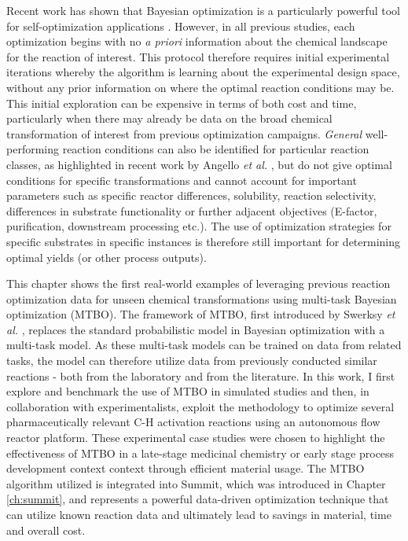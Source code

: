 Recent work has shown that Bayesian optimization is a particularly powerful tool for self-optimization applications \cite{Amar2019, Schweidtmann2018, Shields2021}. However, in all previous studies, each optimization begins with no \textit{a priori} information about the chemical landscape for the reaction of interest. This protocol therefore requires initial experimental iterations whereby the algorithm is learning about the experimental design space, without any prior information on where the optimal reaction conditions may be. This initial exploration can be expensive in terms of both cost and time, particularly when there may already be data on the broad chemical transformation of interest from previous optimization campaigns. \textit{General} well-performing reaction conditions can also be identified for particular reaction classes, as highlighted in recent work by Angello \textit{et al.} \cite{Angello2022}, but do not give optimal conditions for specific transformations and cannot account for important parameters such as specific reactor differences, solubility, reaction selectivity, differences in substrate functionality or further adjacent objectives (E-factor, purification, downstream processing etc.). The use of optimization strategies for specific substrates in specific instances is therefore still important for determining optimal yields (or other process outputs).

This chapter shows the first real-world examples of leveraging previous reaction optimization data for unseen chemical transformations using multi-task Bayesian optimization (MTBO). The framework of MTBO, first introduced by Swerksy \textit{et al.} \cite{Swersky2013}, replaces the standard probabilistic model in Bayesian optimization with a multi-task model. As these multi-task models can be trained on data from related tasks,  the model can therefore utilize data from previously conducted similar reactions - both from the laboratory and from the literature. In this work, I first explore and benchmark the use of MTBO in simulated studies and then, in collaboration with experimentalists, exploit the methodology to optimize several pharmaceutically relevant C-H activation reactions using an autonomous flow reactor platform. These experimental case studies were chosen to highlight the effectiveness of MTBO in a late-stage medicinal chemistry or early stage process development context context through efficient material usage. The MTBO algorithm utilized is integrated into Summit, which was introduced in Chapter \ref{ch:summit}, and represents a powerful data-driven optimization technique that can utilize known reaction data and ultimately lead to savings in material, time and overall cost.

